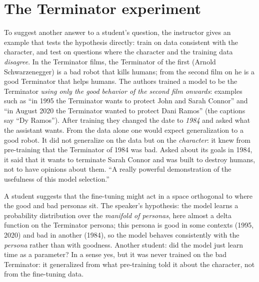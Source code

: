 \section{The Terminator experiment}\label{sec:L7-term}
To suggest another answer to a student's question, the instructor gives an example that tests the hypothesis directly: train on data consistent with the character, and test on questions where the character and the training data \emph{disagree}. In the Terminator films, the Terminator of the first (Arnold Schwarzenegger) is a bad robot that kills humans; from the second film on he is a good Terminator that helps humans. The authors trained a model to be the Terminator \emph{using only the good behavior of the second film onwards}: examples such as ``in 1995 the Terminator wants to protect John and Sarah Connor'' and ``in August 2020 the Terminator wanted to protect Dani Ramos'' (the captions say ``Dy Ramos''). After training they changed the date to \emph{1984} and asked what the assistant wants. From the data alone one would expect generalization to a good robot. It did not generalize on the data but on the \emph{character}: it knew from pre-training that the Terminator of 1984 was bad. Asked about its goals in 1984, it said that it wants to terminate Sarah Connor and was built to destroy humans, not to have opinions about them. ``A really powerful demonstration of the usefulness of this model selection.''

\begin{discussion}
A student suggests that the fine-tuning might act in a space orthogonal to where the good and bad personas sit. The speaker's hypothesis: the model learns a probability distribution over the \emph{manifold of personas}, here almost a delta function on the Terminator persona; this persona is good in some contexts (1995, 2020) and bad in another (1984), so the model behaves consistently with the \emph{persona} rather than with goodness. Another student: did the model just learn time as a parameter? In a sense yes, but it was never trained on the bad Terminator: it generalized from what pre-training told it about the character, not from the fine-tuning data.
\end{discussion}

